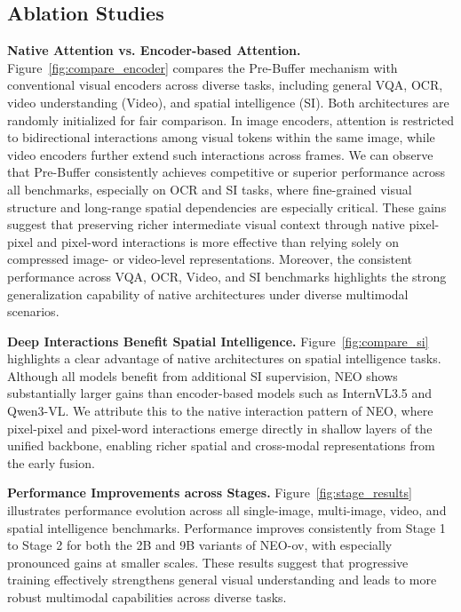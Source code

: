 \documentclass{llmxive}
\begin{document}
\subsection{Ablation Studies}
\textbf{Native Attention vs. Encoder-based Attention.}
Figure~\ref{fig:compare_encoder} compares the Pre-Buffer mechanism with conventional visual encoders across diverse tasks, including general VQA, OCR, video understanding (Video), and spatial intelligence (SI). Both architectures are randomly initialized for fair comparison. In image encoders, attention is restricted to bidirectional interactions among visual tokens within the same image, while video encoders further extend such interactions across frames.
%
We can observe that Pre-Buffer consistently achieves competitive or superior performance across all benchmarks, especially on OCR and SI tasks, where fine-grained visual structure and long-range spatial dependencies are especially critical. These gains suggest that preserving richer intermediate visual context through native pixel-pixel and pixel-word interactions is more effective than relying solely on compressed image- or video-level representations. Moreover, the consistent performance across VQA, OCR, Video, and SI benchmarks highlights the strong generalization capability of native architectures under diverse multimodal scenarios.


\textbf{Deep Interactions Benefit Spatial Intelligence.}
Figure~\ref{fig:compare_si} highlights a clear advantage of native architectures on spatial intelligence tasks. Although all models benefit from additional SI supervision, NEO shows substantially larger gains than encoder-based models such as InternVL3.5 and Qwen3-VL. We attribute this to the native interaction pattern of NEO, where pixel-pixel and pixel-word interactions emerge directly in shallow layers of the unified backbone, enabling richer spatial and cross-modal representations from the early fusion.


\textbf{Performance Improvements across Stages.}
Figure~\ref{fig:stage_results} illustrates performance evolution across all single-image, multi-image, video, and spatial intelligence benchmarks. Performance improves consistently from Stage 1 to Stage 2 for both the 2B and 9B variants of NEO-ov, with especially pronounced gains at smaller scales. These results suggest that progressive training effectively strengthens general visual understanding and leads to more robust multimodal capabilities across diverse tasks.
\end{document}
